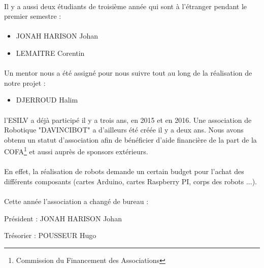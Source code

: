 \documentclass[12pt,a4paper]{article}
\begin{document}
\paragraph{}
Il y a aussi deux étudiants de troisième année qui sont à l'étranger pendant le premier semestre :

\paragraph{}
\begin{itemize}
\item JONAH HARISON Johan
\item LEMAITRE Corentin
\end{itemize}


\paragraph{}
Un mentor nous a été assigné pour nous suivre tout au long de la réalisation de notre projet : 

\begin{itemize}
\item DJERROUD Halim 
\end{itemize}


\paragraph{}
l'ESILV a déjà participé il y a trois ans, en 2015 et en 2016.
Une association de Robotique "DAVINCIBOT" a d'ailleurs été créée il y a deux ans. 
Nous avons obtenu un statut d'association afin de bénéficier d'aide financière de la part de la 
COFA\footnote{Commission du Financement des Associations} et aussi auprès de sponsors extérieurs. 

\paragraph{}
En effet, la réalisation de robots demande un certain budget pour l'achat des différents composants
(cartes Arduino, cartes Raspberry PI, corps des robots ...).

\paragraph{}
Cette année l'association a changé de bureau : 

Président  : JONAH HARISON Johan 

Trésorier : POUSSEUR Hugo 
\end{document}
